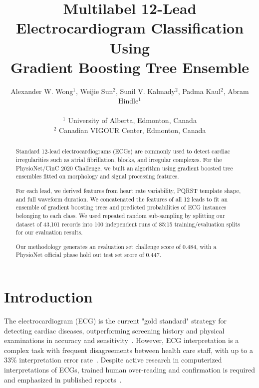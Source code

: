 \documentclass[twocolumn]{cinc}
\begin{document}


\title{Multilabel 12-Lead Electrocardiogram Classification Using \\
Gradient Boosting Tree Ensemble}

\author {Alexander W. Wong$^{1}$, Weijie Sun$^{2}$, Sunil V. Kalmady$^{2}$, Padma Kaul$^{2}$, Abram Hindle$^{1}$\\
\ \\
 $^1$ University of Alberta, Edmonton, Canada \\
$^2$ Canadian VIGOUR Center, Edmonton, Canada }

\maketitle

\begin{abstract}

Standard 12-lead electrocardiograms (ECGs) are commonly used to detect cardiac irregularities such as atrial fibrillation, blocks, and irregular complexes.
For the PhysioNet/CinC 2020 Challenge, we built an algorithm using gradient boosted tree ensembles fitted on morphology and signal processing features.

For each lead, we derived features from heart rate variability, PQRST template shape, and full waveform duration.
We concatenated the features of all 12 leads to fit an ensemble of gradient boosting trees and predicted probabilities of ECG instances belonging to each class.
We used repeated random sub-sampling by splitting our dataset of 43,101 records into 100 independent runs of 85:15 training/evaluation splits for our evaluation results.

Our methodology generates an evaluation set challenge score of 0.484, with a PhysioNet official phase hold out test set score of 0.447.


\end{abstract}

\section{Introduction}

The electrocardiogram (ECG) is the current "gold standard" strategy for detecting cardiac diseases, outperforming screening history and physical examinations in accuracy and sensitivity~\cite{harmon_effectiveness_2015}.
However, ECG interpretation is a complex task with frequent disagreements between health care staff, with up to a 33\% interpretation error rate~\cite{mele_improving_2008}.
Despite active research in computerized interpretations of ECGs, trained human over-reading and confirmation is required and emphasized in published reports~\cite{schlapfer_computer-interpreted_2017}.
\end{document}
